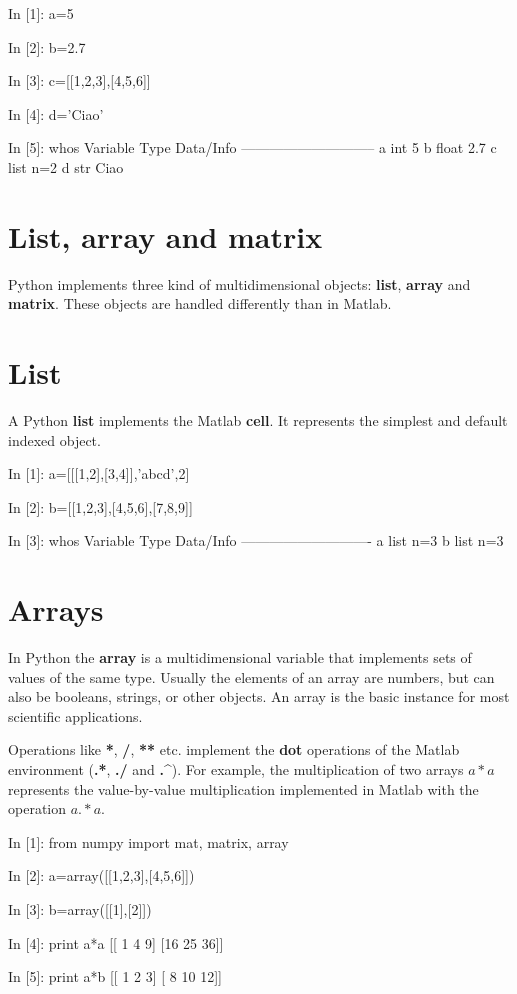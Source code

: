 \begin{code}
In [1]: a=5

In [2]: b=2.7

In [3]: c=[[1,2,3],[4,5,6]]

In [4]: d='Ciao'

In [5]: whos
Variable   Type     Data/Info
-----------------------------
a          int      5
b          float    2.7
c          list     n=2
d          str      Ciao
\end{code}


\section{List, array and matrix}
Python implements three kind of multidimensional objects: \textbf{list}, 
\textbf{array} and \textbf{matrix}. 
These objects are handled differently than in Matlab.

\section{List}
A Python \textbf{list} implements the Matlab \textbf{cell}. It represents 
the simplest and default indexed object. 

\begin{code}
In [1]: a=[[[1,2],[3,4]],'abcd',2]

In [2]: b=[[1,2,3],[4,5,6],[7,8,9]]

In [3]: whos
Variable   Type    Data/Info
----------------------------
a          list    n=3
b          list    n=3
\end{code}


\section{Arrays}
In Python the \textbf{array} is a multidimensional variable that implements 
sets of values of the same type. Usually the elements of an array are numbers, 
but can also be booleans, strings, or other objects. An array is the basic 
instance for most scientific applications.

Operations like \textbf{*}, \textbf{/}, \textbf{**} 
etc. implement the \textbf{dot} operations of the Matlab environment 
(\textbf{.*}, \textbf{./} and \textbf{.\^}).
For example, the multiplication of two arrays $a*a$ represents the 
value-by-value multiplication implemented in Matlab with the operation $a.*a$.

\begin{code}
In [1]: from numpy import mat, matrix, array

In [2]: a=array([[1,2,3],[4,5,6]])

In [3]: b=array([[1],[2]])

In [4]: print a*a
[[ 1  4  9]
 [16 25 36]]

In [5]: print a*b
[[ 1  2  3]
 [ 8 10 12]]
\end{code}

